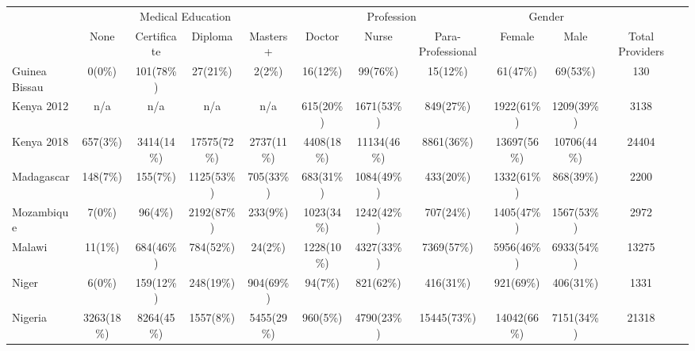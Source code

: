 \def\sym#1{\ifmmode^{#1}\else\(^{#1}\)\fi}
\begin{tabular}{l*{11}{c}}
\hline\hline
&\multicolumn{4}{c}{Medical Education} &\multicolumn{3}{c}{Profession}  &\multicolumn{2}{c}{Gender}    \\\cmidrule(lr){2-5}\cmidrule(lr){6-8}\cmidrule(lr){9-10}
&\multicolumn{1}{c}{None}&\multicolumn{1}{c}{Certificate}&\multicolumn{1}{c}{Diploma}&\multicolumn{1}{c}{Masters+}&\multicolumn{1}{c}{Doctor}&\multicolumn{1}{c}{Nurse}&\multicolumn{1}{c}{Para-Professional}&\multicolumn{1}{c}{Female}&\multicolumn{1}{c}{Male}&\multicolumn{1}{c}{Total Providers}&\\
\hline
Guinea Bissau&         {0(0\%)}&        {101(78\%)}&    {27(21\%)}&             {2(2\%)}&             {16(12\%)}&        {99(76\%)}&    {15(12\%)}&             {61(47\%)}&               {69(53\%)}&             {130}\\
Kenya 2012&            {n/a}&                           {n/a}&                                 {n/a}&                                  {n/a}&                                  {615(20\%)}&        {1671(53\%)}&    {849(27\%)}&             {1922(61\%)}&               {1209(39\%)}&             {3138}\\
Kenya 2018&        {657(3\%)}&    {3414(14\%)}&    {17575(72\%)}&     {2737(11\%)}&             {4408(18\%)}&    {11134(46\%)}&        {8861(36\%)}&             {13697(56\%)}&               {10706(44\%)}&             {24404}\\
Madagascar&        {148(7\%)}&    {155(7\%)}&    {1125(53\%)}&     {705(33\%)}&             {683(31\%)}&    {1084(49\%)}&        {433(20\%)}&             {1332(61\%)}&               {868(39\%)}&             {2200}\\
Mozambique&        {7(0\%)}&    {96(4\%)}&    {2192(87\%)}&     {233(9\%)}&             {1023(34\%)}&    {1242(42\%)}&        {707(24\%)}&             {1405(47\%)}&               {1567(53\%)}&             {2972}\\
Malawi&                {11(1\%)}&        {684(46\%)}&    {784(52\%)}&     {24(2\%)}&             {1228(10\%)}&    {4327(33\%)}&        {7369(57\%)}&             {5956(46\%)}&               {6933(54\%)}&             {13275}\\
Niger&                 {6(0\%)}&        {159(12\%)}&    {248(19\%)}&     {904(69\%)}&             {94(7\%)}&    {821(62\%)}&        {416(31\%)}&             {921(69\%)}&               {406(31\%)}&             {1331}\\
Nigeria&               {3263(18\%)}&        {8264(45\%)}&    {1557(8\%)}&     {5455(29\%)}&             {960(5\%)}&    {4790(23\%)}&        {15445(73\%)}&             {14042(66\%)}&               {7151(34\%)}&             {21318}\\

\end{tabular}
